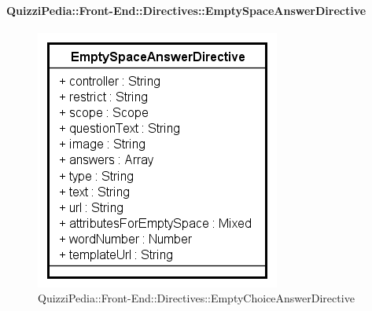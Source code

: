 		\paragraph{QuizziPedia::Front-End::Directives::EmptySpaceAnswerDirective}
		
		\label{QuizziPedia::Front-End::Directives::EmptySpaceAnswerDirective}
		
		\begin{figure}[ht]
			\centering
			\includegraphics[scale=0.80,keepaspectratio]{UML/Classi/Front-End/QuizziPedia_Front-end_Templates_EmptySpaceAnswerTemplate.png}
			\caption{QuizziPedia::Front-End::Directives::EmptyChoiceAnswerDirective}
		\end{figure} \FloatBarrier
		
